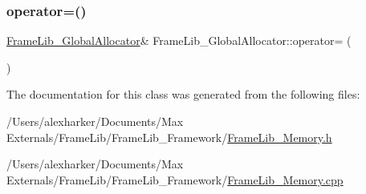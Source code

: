 \mbox{\label{class_frame_lib___global_allocator_a23d4689821a194c5f89227d135a5703c}} 
\subsubsection{\texorpdfstring{operator=()}{operator=()}}
{\footnotesize\ttfamily \hyperlink{class_frame_lib___global_allocator}{Frame\+Lib\+\_\+\+Global\+Allocator}\& Frame\+Lib\+\_\+\+Global\+Allocator\+::operator= (\begin{DoxyParamCaption}\item[{const \hyperlink{class_frame_lib___global_allocator}{Frame\+Lib\+\_\+\+Global\+Allocator} \&}]{ }\end{DoxyParamCaption})\hspace{0.3cm}{\ttfamily [delete]}}



The documentation for this class was generated from the following files\+:\begin{DoxyCompactItemize}
\item 
/\+Users/alexharker/\+Documents/\+Max Externals/\+Frame\+Lib/\+Frame\+Lib\+\_\+\+Framework/\hyperlink{_frame_lib___memory_8h}{Frame\+Lib\+\_\+\+Memory.\+h}\item 
/\+Users/alexharker/\+Documents/\+Max Externals/\+Frame\+Lib/\+Frame\+Lib\+\_\+\+Framework/\hyperlink{_frame_lib___memory_8cpp}{Frame\+Lib\+\_\+\+Memory.\+cpp}\end{DoxyCompactItemize}
